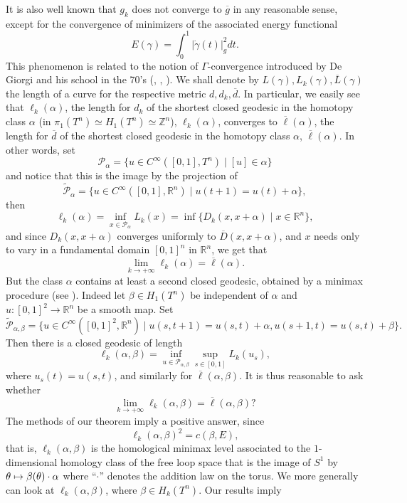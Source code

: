 \documentclass[JEP,XML,SOM,NoFloatCountersInSection,Unicode,published]{cedram}
\newcommand\mto{\mathchoice{\longmapsto}{\mapsto}{\mapsto}{\mapsto}}
\numberwithin{equation}{section}
\theoremstyle{plain}
\theoremstyle{definition}
\theoremstyle{remark}
\begin{document}
It is also well known that $g_{k}$ does not converge to $\overline g$
in any reasonable sense, except for the convergence of minimizers of
the associated energy functional
\[
E(\gamma) = \int_{0}^{1} \vert \dot\gamma(t)\vert ^{2}_{g} dt.
\]
This phenomenon is related to the notion of $\Gamma$-convergence introduced by De Giorgi and his school in the 70's (\cf \cite{deGiorgi, deGiorgi-Franzoni}, \cite{DalMaso}, \cite{Braides}). We shall denote by
$L(\gamma), L_k(\gamma), \overline L (\gamma)$ the length of a curve for the respective metric $d, d_k, \overline d$.
In particular, we easily see that $\ell_{k}(\alpha)$, the length for
$d_{k}$ of the shortest closed geodesic in the homotopy class $\alpha$
(in $\pi_1(T^n)\simeq H_1(T^n)\simeq \mathbb{Z}^{n}$), $\ell_{k}(\alpha)$, converges to ${\overline\ell} (\alpha)$, the length for
$\overline d$ of the shortest closed geodesic in the homotopy class $\alpha$, $\overline\ell(\alpha)$.
In other words, set
\[
\mathcal P_\alpha=\{ u\in C^\infty([0,1], T^n) \mid [u]\in \alpha \}
\]
and notice that this is the image by the projection of
\[
\widetilde {\mathcal P}_ \alpha =\{ u\in C^\infty([0,1], {\mathbb R}^n) \mid u(t+1)=u(t)+ \alpha \},
\]
then
\[
\ell_{k} (\alpha) = \inf_{x\in \mathcal P_\alpha} L_k(x)=\inf \{ D_{k}(x,x+\alpha)\mid x \in \mathbb{R}^{n}\},
\]
and since $D_{k}(x,x+\alpha)$ converges uniformly to $\overline D(x,x+\alpha)$, and
$x$ needs only to vary in a fundamental domain $[0,1]^{n}$ in $\mathbb{R}^{n}$, we get that
\[
\lim_{k\to+\infty} \ell_{k} (\alpha) = \overline\ell (\alpha).
\]
But the class $\alpha$ contains at least a second
closed geodesic, obtained by a minimax procedure (see \cite[p.\,133]{Birkhoff}). Indeed let $\beta \in H_1(T^n)$ be independent of $\alpha$ and $u: [0,1]^2 \to {\mathbb R}^n$ be a smooth map. Set
\[
\widetilde{\mathcal P}_{\alpha, \beta}=\{ u\in C^\infty([0,1]^2, {\mathbb R}^n) \mid u(s, t+1)=u(s,t)+\alpha, u(s+1,t)=u(s,t)+\beta\}.
\]
Then there is a closed geodesic of length
\[
\ell_{k} (\alpha,\beta) =\inf_{u\in \mathcal P_{\alpha, \beta}} \sup_{s\in [0,1]} L_{k}(u_s),
\]
where $u_s(t)=u(s,t)$,
and similarly for $\overline\ell (\alpha,\beta)$. It is thus reasonable to ask whether
\[
\lim_{k\to +\infty} \ell_{k} (\alpha,\beta) = \overline\ell (\alpha,
\beta) ?
\]
The methods of our theorem imply a positive answer, since
\[
\ell_{k}(\alpha, \beta)^2= c(\beta, E),
\]
that is, $\ell_{k}(\alpha, \beta)$ is the homological minimax level associated to the $1$-dimensional homology class of the free loop space that is the image of
$S^{1}$ by $\theta \mto \beta(\theta)\cdot \alpha $ where ``$\cdot$'' denotes the addition law on the torus. We more generally can look at
$\ell_k(\alpha, \beta)$, where $\beta \in H_k(T^n)$.
Our results imply
\end{document}
